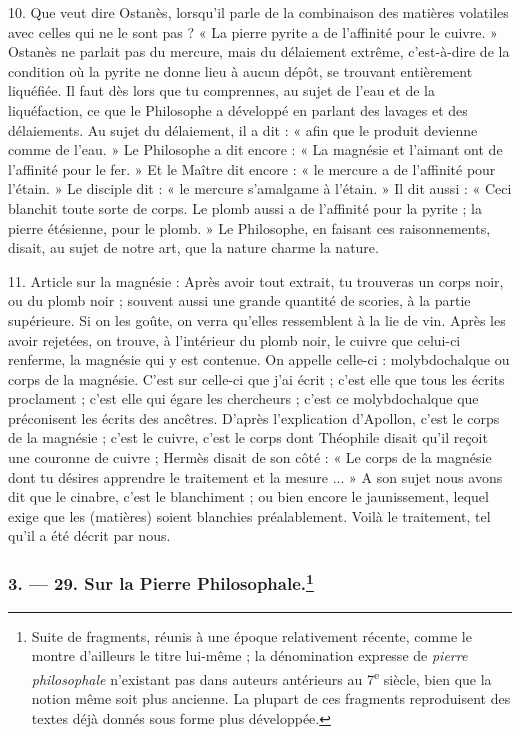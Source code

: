 \documentclass[a4paper, 11pt, oneside, polutonikogreek, french]{article}
\begin{document}
10. Que veut dire Ostanès, lorsqu'il parle de la combinaison des matières volatiles avec celles qui ne le sont pas ? « La pierre pyrite a de l'affinité pour le cuivre. » Ostanès ne parlait pas du mercure, mais du délaiement extrême, c'est-à-dire de la condition où la pyrite ne donne lieu à aucun dépôt, se trouvant entièrement liquéfiée. Il faut dès lors que tu comprennes, au sujet de l'eau et de la liquéfaction, ce que le Philosophe a développé en parlant des lavages et des délaiements. Au sujet du délaiement, il a dit : « afin que le produit devienne comme de l'eau. » Le Philosophe a dit encore : « La magnésie et l'aimant ont de l'affinité pour le fer. » Et le Maître dit encore : « le mercure a de l'affinité pour l'étain. » Le disciple dit : « le mercure s'amalgame à l'étain. » Il dit aussi : « Ceci blanchit toute sorte de corps. Le plomb aussi a de l'affinité pour la pyrite ; la pierre étésienne, pour le plomb. » Le Philosophe, en faisant ces raisonnements, disait, au sujet de notre art, que la nature charme la nature.

11. Article sur la magnésie : Après avoir tout extrait, tu trouveras un corps noir, ou du plomb noir ; souvent aussi une grande quantité de scories, à la partie supérieure. Si on les goûte, on verra qu'elles ressemblent à la lie de vin. Après les avoir rejetées, on trouve, à l'intérieur du plomb noir, le cuivre que celui-ci renferme, la magnésie qui y est contenue. On appelle celle-ci : molybdochalque ou corps de la magnésie. C'est sur celle-ci que j'ai écrit ; c'est elle que tous les écrits proclament ; c'est elle qui égare les chercheurs ; c'est ce molybdochalque que préconisent les écrits des ancêtres. D'après l'explication d'Apollon, c'est le corps de la magnésie ; c'est le cuivre, c'est le corps dont Théophile disait qu'il reçoit une couronne de cuivre ; Hermès disait de son côté : « Le corps de la magnésie dont tu désires apprendre le traitement et la mesure ... » A son sujet nous avons dit que le cinabre, c'est le blanchiment ; ou bien encore le jaunissement, lequel exige que les (matières) soient blanchies préalablement. Voilà le traitement, tel qu'il a été décrit par nous.

\bigskip
\centerline{\EightStarTaper}
\centerline{\EightStarTaper\EightStarTaper}
\bigskip

\subsubsection[3. --- 29. Sur la Pierre Philosophale.]{3. --- 29. Sur la Pierre Philosophale.\footnote{Suite de fragments, réunis à une époque relativement récente, comme le montre d'ailleurs le titre lui-même ; la dénomination expresse de \emph{pierre philosophale} n'existant pas dans auteurs antérieurs au 7\textsuperscript{e} siècle, bien que la notion même soit plus ancienne. La plupart de ces fragments reproduisent des textes déjà donnés sous forme plus développée.}}
\end{document}
